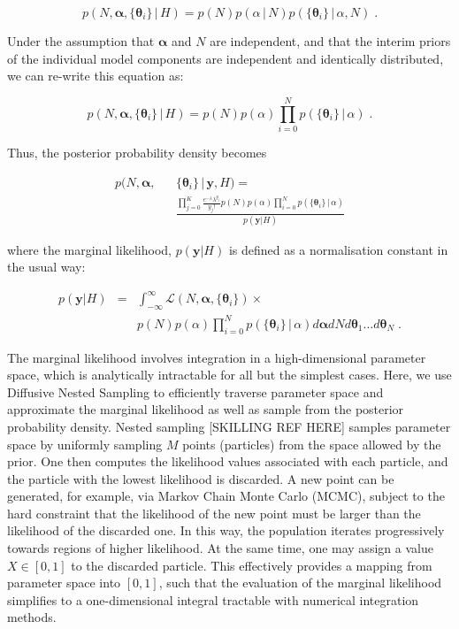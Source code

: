 \documentclass[12pt]{emulateapj}
\newcommand{\given}{\,|\,}
\newcommand{\counts}{y}
\newcommand{\likelihood}{{\mathcal L}}
\begin{document}
\begin{equation}
p(N, \bm{\alpha}, \{\bm{\theta}_i \} \given H) = p(N)p(\alpha\given N)p(\{\bm{\theta}_i\}\given \alpha, N) \; .
\end{equation}

Under the assumption that $\bm{\alpha}$ and $N$ are independent, and that the interim priors of the individual model components are
independent and identically distributed, we can re-write this equation as:

\begin{equation}
p(N, \bm{\alpha}, \{\bm{\theta}_i \} \given H) = p(N)p(\alpha) \prod\limits_{i=0}^{N}  p(\{\bm{\theta}_i\}\given \alpha) \; .
\end{equation}

Thus, the posterior probability density becomes

\begin{eqnarray}
p(N, \bm{\alpha}, &&\{\bm{\theta}_i \}  \given \bm{\counts}, H) = \\ 
&& \frac{\prod\limits_{j=0}^{K}{ \frac{e^{-\lambda} \lambda^{y_j} }{y_j! }} p(N)p(\alpha) \prod\limits_{i=0}^{N}  p(\{\bm{\theta}_i\}\given \alpha)}{p(\bm{\counts} | H)}  \nonumber
\end{eqnarray}

where the marginal likelihood, $p(\bm{\counts} | H)$ is defined as a normalisation constant in the usual way: 

\begin{eqnarray}
p(\bm{\counts} | H) & = & \int_{-\infty}^{\infty}{\likelihood(N, \bm{\alpha}, \{\bm{\theta}_i \})} \times \\ \nonumber
&& p(N)p(\alpha) \prod\limits_{i=0}^{N}  p(\{\bm{\theta}_i\}\given \alpha) d\bm{\alpha} dN d\bm{\theta}_1 ... d\bm{\theta}_N \; .
\end{eqnarray}

The marginal likelihood involves integration in a high-dimensional parameter space, which is analytically intractable for all but the
simplest cases. Here, we use Diffusive Nested Sampling to efficiently traverse parameter space and approximate the marginal 
likelihood as well as sample from the posterior probability density. 
Nested sampling [SKILLING REF HERE] samples parameter space by uniformly sampling $M$ points (particles) from the space allowed by the prior. 
One then computes the likelihood values associated with each particle, and the particle with the lowest likelihood is discarded. A new point
can be generated, for example, via Markov Chain Monte Carlo (MCMC), subject to the hard constraint that the
likelihood of the new point must be larger than the likelihood of the discarded one. In this way, the population iterates progressively towards
regions of higher likelihood. At the same time, one may assign a value $X  \in [0, 1]$ to the discarded particle. This effectively provides a 
mapping from parameter space into $[0,1]$, such that the evaluation of the marginal likelihood simplifies to a one-dimensional 
integral tractable with numerical integration methods.
\end{document}
